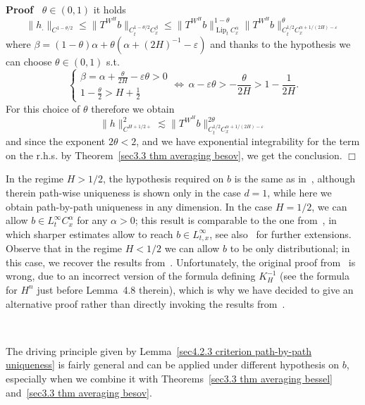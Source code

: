 \documentclass[10pt]{article}
\newcommand{\tmop}[1]{\ensuremath{\operatorname{#1}}}
\newenvironment{proof}{\noindent\textbf{Proof\ }}{\hspace*{\fill}$\Box$\medskip}
\begin{document}
\begin{proof}
  $\theta \in (0, 1)$ it holds
  \[ \| h_. \|_{C^{1 - \theta / 2}} \leqslant \| T^{W^H} b \|_{C^{1 - \theta /
     2}_t C^{\beta}_x} \leqslant \| T^{W^H} b \|^{1 - \theta}_{\tmop{Lip}_t
     C^{\alpha}_x}  \| T^{W^H} b \|^{\theta}_{C^{1 / 2}_t C^{\alpha + 1 / (2
     H) - \varepsilon}_x} \]
  where $\beta = (1 - \theta) \alpha + \theta (\alpha + (2 H)^{- 1} -
  \varepsilon)$ and thanks to the hypothesis we can choose $\theta \in (0, 1)$
  s.t.
  \[ \left\{\begin{array}{l}
       \beta = \alpha + \frac{\theta}{2 H} - \varepsilon \theta > 0\\
       1 - \frac{\theta}{2} > H + \frac{1}{2}
     \end{array}\right. \Longleftrightarrow \, \alpha - \varepsilon \theta > -
     \frac{\theta}{2 H} > 1 - \frac{1}{2 H} . \]
  For this choice of $\theta$ therefore we obtain
  \[ \| h \|_{C^{H + 1 / 2 +}}^2 \lesssim \| T^{W^H} b \|^{2 \theta}_{C^{1 /
     2}_t C^{\alpha + 1 / (2 H) - \varepsilon}_x} \]
  and since the exponent $2 \theta < 2$, and we have exponential integrability
  for the term on the r.h.s. by Theorem~\ref{sec3.3 thm averaging besov}, we
  get the conclusion.
\end{proof}

In the regime $H > 1 / 2$, the hypothesis required on $b$ is the same as
in~{\cite{nualartouknine}}, although therein path-wise uniqueness is shown
only in the case $d = 1$, while here we obtain path\mbox{-}by\mbox{-}path
uniqueness in any dimension. In the case $H = 1 / 2$, we can allow $b \in
L^{\infty}_t C^{\alpha}_x$ for any $\alpha > 0$; this result is comparable to
the one from~{\cite{davie}}, in which sharper estimates allow to reach $b \in
L^{\infty}_{t, x}$, see also~{\cite{shaposhnikov1,shaposhnikov2}} for further
extensions. Observe that in the regime $H < 1 / 2$ we can allow $b$ to be only
distributional; in this case, we recover the results
from~{\cite{catelliergubinelli}}. Unfortunately, the original proof
from~{\cite{catelliergubinelli}} is wrong, due to an incorrect version of the
formula defining $K_H^{- 1}$ (see the formula for $H^n$ just before Lemma~4.8
therein), which is why we have decided to give an alternative proof rather
than directly invoking the results from~{\cite{catelliergubinelli}}.

\

The driving principle given by Lemma~\ref{sec4.2.3 criterion path-by-path
uniqueness} is fairly general and can be applied under different hypothesis on
$b$, especially when we combine it with Theorems~\ref{sec3.3 thm averaging
bessel} and~\ref{sec3.3 thm averaging besov}.
\end{document}
